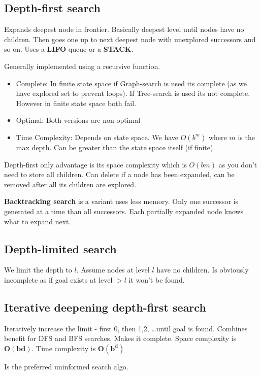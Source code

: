 \subsection{Depth-first search}
Expands deepest node in frontier. Basically deepest level until nodes have no children. Then goes one up to next deepest node with unexplored successors and so on. Uses a \textbf{LIFO }queue or a \textbf{STACK}.

Generally implemented using a recursive function. 



\begin{itemize}
    \item Complete: In finite state space if Graph-search is used its complete (as we have explored set to prevent loops). If Tree-search is used its not complete. However in finite state space both fail.
    \item Optimal: Both versions are non-optimal
    \item Time Complexity: Depends on state space. We have $O(b^{m})$ where $m$ is the max depth. Can be greater than the state space itself (if finite).
\end{itemize}

Depth-first only advantage is its space complexity which is $O(bm)$ as you don't need to store all children. Can delete if a node has been expanded, can be removed after all its children are explored.

\textbf{Backtracking search} is a variant uses less memory. Only one successor is generated at a time than all successors. Each partially expanded node knows what to expand next.


\subsection{Depth-limited search}
We limit the depth to $l$. Assume nodes at level $l$ have no children. Is obviously incomplete as if goal exists at level $> l$ it won't be found.

\subsection{Iterative deepening depth-first search}
Iteratively increase the limit - first 0, then 1,2, \dots until goal is found. Combines benefit for DFS and BFS searches. Makes it complete. Space complexity is $\mathbf{O(bd)}$. Time complexity is  $\mathbf{O(b^{d})} $

Is the preferred uninformed search algo.

